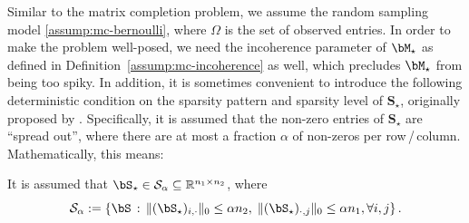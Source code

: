 Similar to the matrix completion problem, we assume the random sampling model \eqref{assump:mc-bernoulli}, where $\Omega$ is the set of observed entries. 
In order to make the problem well-posed, we need the incoherence parameter of $\bM_{\star}$ as defined in Definition~\ref{assump:mc-incoherence} as well, which precludes $\bM_{\star}$ from being too spiky.  In addition, it is sometimes convenient to introduce the following deterministic condition on the sparsity pattern and sparsity level of $\bm{S}_{\star}$,  originally proposed by \cite{chandrasekaran2011siam}. Specifically, it is assumed that the non-zero entries of $\bm{S}_{\star}$ are ``spread out'', where there are at most a  fraction $\alpha$ of non-zeros per row\,/\,column. Mathematically, this means:

\begin{assumption}
	It is assumed that $\bS_{\star}\in\mathcal{S}_\alpha\subseteq \mathbb{R}^{n_1\times n_2}$, where
%
\begin{equation}
	\mathcal{S}_\alpha := \left\{\bS \,:\,  \|(\bS_{\star})_{i,\cdot}\|_0 \leq \alpha n_2, \; \|(\bS_{\star})_{\cdot,j}\|_0 \leq \alpha n_1, \forall i,j \right\}. 
\end{equation}
%
\end{assumption}


